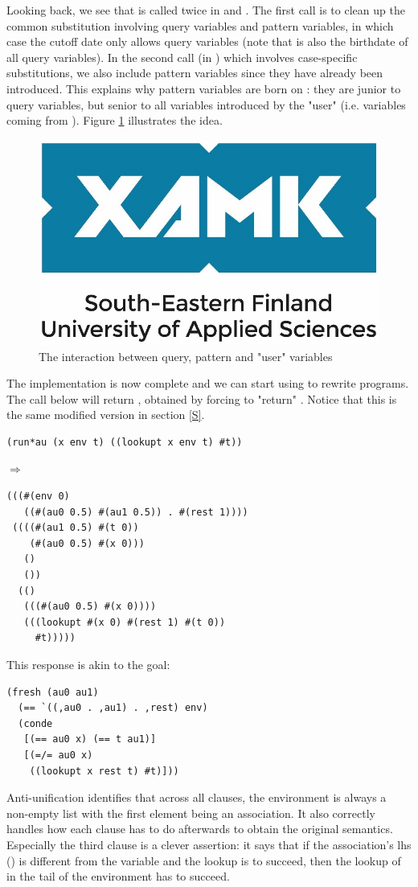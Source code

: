 Looking back, we see that  is called twice in  and . The first call is to clean up the common substitution involving query variables and pattern variables, in which case the cutoff date only allows query variables (note that  is also the birthdate of all query variables). In the second call (in ) which involves case-specific substitutions, we also include pattern variables since they have already been introduced. This explains why pattern variables are born on : they are junior to query variables, but senior to all variables introduced by the "user" (i.e. variables coming from ). Figure \ref{fig:au_S} illustrates the idea.
\begin{figure}[h]
    \centering
    \includegraphics{figures/logo.jpg}
    \caption{The interaction between query, pattern and "user" variables}
    \label{fig:au_S}
\end{figure}


The implementation is now complete and we can start using  to rewrite programs. The call below will return , obtained by forcing  to "return" . Notice that this  is the same modified version in section \ref{S}.
\begin{lstlisting}
(run*au (x env t) ((lookupt x env t) #t))
\end{lstlisting}
$\Rightarrow$
\begin{lstlisting}
(((#(env 0)
   ((#(au0 0.5) #(au1 0.5)) . #(rest 1))))
 ((((#(au1 0.5) #(t 0))
    (#(au0 0.5) #(x 0)))
   ()
   ())
  (()
   (((#(au0 0.5) #(x 0))))
   (((lookupt #(x 0) #(rest 1) #(t 0))
     #t)))))
\end{lstlisting}
This response is akin to the goal:
\begin{lstlisting}
(fresh (au0 au1)
  (== `((,au0 . ,au1) . ,rest) env)
  (conde
   [(== au0 x) (== t au1)]
   [(=/= au0 x)
    ((lookupt x rest t) #t)]))
\end{lstlisting}
Anti-unification identifies that across all clauses, the environment is always a non-empty list with the first element being an association. It also correctly handles how each clause has to do afterwards to obtain the original semantics. Especially the third clause is a clever assertion: it says that if the association's lhs () is different from the variable  and the lookup is to succeed, then the lookup of  in the tail of the environment has to succeed.

